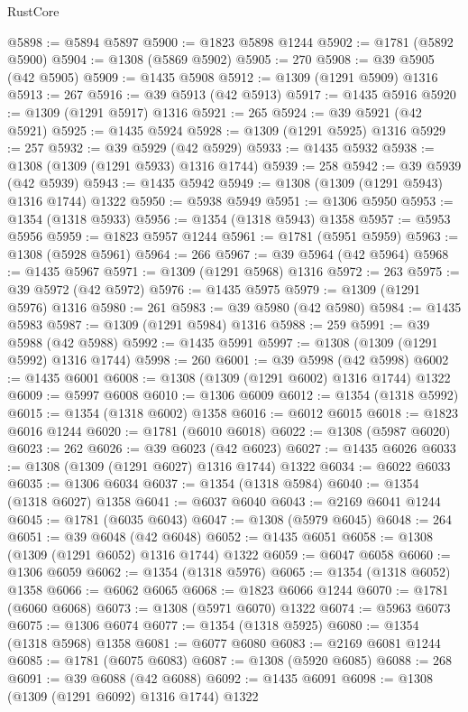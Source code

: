 \begin{lexlean}{RustCore}
\begin{coremodule}
@5898 := @5894 @5897
@5900 := @1823 @5898 @1244
@5902 := @1781 (@5892 @5900)
@5904 := @1308 (@5869 @5902)
@5905 := 270
@5908 := @39 @5905 (@42 @5905)
@5909 := @1435 @5908
@5912 := @1309 (@1291 @5909) @1316
@5913 := 267
@5916 := @39 @5913 (@42 @5913)
@5917 := @1435 @5916
@5920 := @1309 (@1291 @5917) @1316
@5921 := 265
@5924 := @39 @5921 (@42 @5921)
@5925 := @1435 @5924
@5928 := @1309 (@1291 @5925) @1316
@5929 := 257
@5932 := @39 @5929 (@42 @5929)
@5933 := @1435 @5932
@5938 := @1308 (@1309 (@1291 @5933) @1316 @1744)
@5939 := 258
@5942 := @39 @5939 (@42 @5939)
@5943 := @1435 @5942
@5949 := @1308 (@1309 (@1291 @5943) @1316 @1744) @1322
@5950 := @5938 @5949
@5951 := @1306 @5950
@5953 := @1354 (@1318 @5933)
@5956 := @1354 (@1318 @5943) @1358
@5957 := @5953 @5956
@5959 := @1823 @5957 @1244
@5961 := @1781 (@5951 @5959)
@5963 := @1308 (@5928 @5961)
@5964 := 266
@5967 := @39 @5964 (@42 @5964)
@5968 := @1435 @5967
@5971 := @1309 (@1291 @5968) @1316
@5972 := 263
@5975 := @39 @5972 (@42 @5972)
@5976 := @1435 @5975
@5979 := @1309 (@1291 @5976) @1316
@5980 := 261
@5983 := @39 @5980 (@42 @5980)
@5984 := @1435 @5983
@5987 := @1309 (@1291 @5984) @1316
@5988 := 259
@5991 := @39 @5988 (@42 @5988)
@5992 := @1435 @5991
@5997 := @1308 (@1309 (@1291 @5992) @1316 @1744)
@5998 := 260
@6001 := @39 @5998 (@42 @5998)
@6002 := @1435 @6001
@6008 := @1308 (@1309 (@1291 @6002) @1316 @1744) @1322
@6009 := @5997 @6008
@6010 := @1306 @6009
@6012 := @1354 (@1318 @5992)
@6015 := @1354 (@1318 @6002) @1358
@6016 := @6012 @6015
@6018 := @1823 @6016 @1244
@6020 := @1781 (@6010 @6018)
@6022 := @1308 (@5987 @6020)
@6023 := 262
@6026 := @39 @6023 (@42 @6023)
@6027 := @1435 @6026
@6033 := @1308 (@1309 (@1291 @6027) @1316 @1744) @1322
@6034 := @6022 @6033
@6035 := @1306 @6034
@6037 := @1354 (@1318 @5984)
@6040 := @1354 (@1318 @6027) @1358
@6041 := @6037 @6040
@6043 := @2169 @6041 @1244
@6045 := @1781 (@6035 @6043)
@6047 := @1308 (@5979 @6045)
@6048 := 264
@6051 := @39 @6048 (@42 @6048)
@6052 := @1435 @6051
@6058 := @1308 (@1309 (@1291 @6052) @1316 @1744) @1322
@6059 := @6047 @6058
@6060 := @1306 @6059
@6062 := @1354 (@1318 @5976)
@6065 := @1354 (@1318 @6052) @1358
@6066 := @6062 @6065
@6068 := @1823 @6066 @1244
@6070 := @1781 (@6060 @6068)
@6073 := @1308 (@5971 @6070) @1322
@6074 := @5963 @6073
@6075 := @1306 @6074
@6077 := @1354 (@1318 @5925)
@6080 := @1354 (@1318 @5968) @1358
@6081 := @6077 @6080
@6083 := @2169 @6081 @1244
@6085 := @1781 (@6075 @6083)
@6087 := @1308 (@5920 @6085)
@6088 := 268
@6091 := @39 @6088 (@42 @6088)
@6092 := @1435 @6091
@6098 := @1308 (@1309 (@1291 @6092) @1316 @1744) @1322

\end{coremodule}
\end{lexlean}
